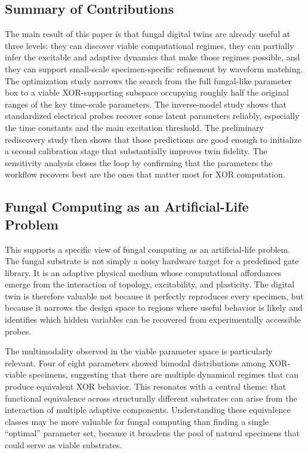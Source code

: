 \documentclass[letterpaper]{article}
\begin{document}
\subsection{Summary of Contributions}
The main result of this paper is that fungal digital twins are already useful at three levels: they can discover viable computational regimes, they can partially infer the excitable and adaptive dynamics that make those regimes possible, and they can support small-scale specimen-specific refinement by waveform matching. The optimization study narrows the search from the full fungal-like parameter box to a viable XOR-supporting subspace occupying roughly half the original ranges of the key time-scale parameters. The inverse-model study shows that standardized electrical probes recover some latent parameters reliably, especially the time constants and the main excitation threshold. The preliminary rediscovery study then shows that those predictions are good enough to initialize a second calibration stage that substantially improves twin fidelity. The sensitivity analysis closes the loop by confirming that the parameters the workflow recovers best are the ones that matter most for XOR computation.

\subsection{Fungal Computing as an Artificial-Life Problem}
This supports a specific view of fungal computing as an artificial-life problem. The fungal substrate is not simply a noisy hardware target for a predefined gate library. It is an adaptive physical medium whose computational affordances emerge from the interaction of topology, excitability, and plasticity. The digital twin is therefore valuable not because it perfectly reproduces every specimen, but because it narrows the design space to regions where useful behavior is likely and identifies which hidden variables can be recovered from experimentally accessible probes.

The multimodality observed in the viable parameter space is particularly relevant. Four of eight parameters showed bimodal distributions among XOR-viable specimens, suggesting that there are multiple dynamical regimes that can produce equivalent XOR behavior. This resonates with a central theme: that functional equivalence across structurally different substrates can arise from the interaction of multiple adaptive components. Understanding these equivalence classes may be more valuable for fungal computing than finding a single ``optimal'' parameter set, because it broadens the pool of natural specimens that could serve as viable substrates.
\end{document}
